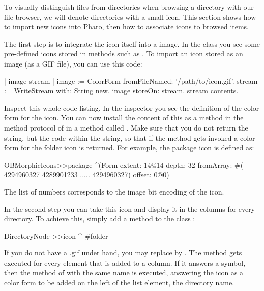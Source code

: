\documentclass[a4paper,10pt,twoside]{book}
\begin{document}
To visually distinguish files from directories when browsing a directory with our file browser, we will denote directories with a small icon. This section shows how to import new icons into Pharo, then how to associate icons to browsed items.

The first step is to integrate the icon itself into a \pharo image. In the class  you see some pre-defined icons stored in methods such as . To import an icon stored as an image (\eg as a GIF file), you can use this code:

\begin{code}{}
| image stream |
image := ColorForm fromFileNamed: '/path/to/icon.gif'.
stream := WriteStream with: String new.
image storeOn: stream.
stream contents.
\end{code}

Inspect this whole code listing. In the inspector you see the definition of the color form for the icon. You can now install the content of this  as a method in the method protocol  of  in a method called . Make sure that you do not return the string, but the code within the string, so that if the method gets invoked a color form for the folder icon is returned. For example, the package icon is defined as:

\begin{code}{}
OBMorphicIcons>>package
    ^(Form
	extent: 14@14
	depth: 32
	fromArray: #( 4294960327 4289901233 .....  4294960327)
	offset: 0@0)
\end{code}

The list of numbers corresponds to the image bit encoding of the icon.

In the second step you can take this icon and display it in the columns for every directory. To achieve this, simply add a method  to the class :

\begin{code}{}
DirectoryNode >>icon
	^ #folder  
\end{code}

If you do not have a .gif under hand, you may replace  by . The method  gets executed for every element that is added to a column. If it answers a symbol, then the method of  with the same name is executed, answering the icon as a color form to be added on the left of the list element, \ie the directory name.


\end{document}
